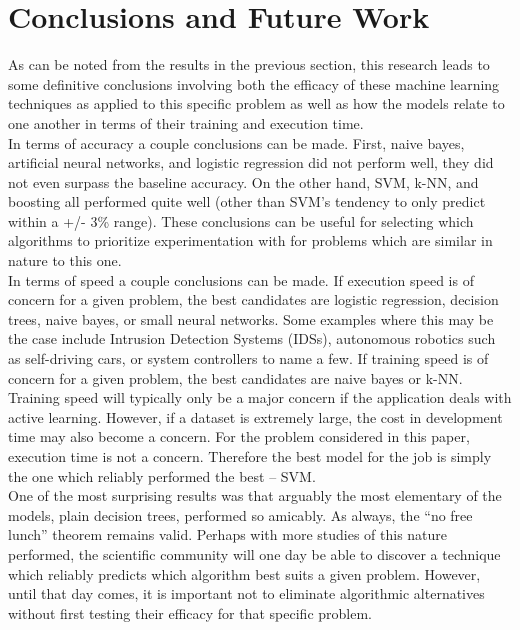 \documentclass[titlepage]{article}
\begin{document}
\section{Conclusions and Future Work}
As can be noted from the results in the previous section, this research leads to some definitive conclusions involving both the efficacy of these machine learning techniques as applied to this specific problem as well as how the models relate to one another in terms of their training and execution time.\\
In terms of accuracy a couple conclusions can be made. First, naive bayes, artificial neural networks, and logistic regression did not perform well, they did not even surpass the baseline accuracy. On the other hand, SVM, k-NN, and boosting all performed quite well (other than SVM's tendency to only predict within a +/- 3\% range). These conclusions can be useful for selecting which algorithms to prioritize experimentation with for problems which are similar in nature to this one.\\
In terms of speed a couple conclusions can be made. If execution speed is of concern for a given problem, the best candidates are logistic regression, decision trees, naive bayes, or small neural networks. Some examples where this may be the case include Intrusion Detection Systems (IDSs), autonomous robotics such as self-driving cars, or system controllers to name a few. If training speed is of concern for a given problem, the best candidates are naive bayes or k-NN. Training speed will typically only be a major concern if the application deals with active learning. However, if a dataset is extremely large, the cost in development time may also become a concern. For the problem considered in this paper, execution time is not a concern. Therefore the best model for the job is simply the one which reliably performed the best -- SVM.\\
One of the most surprising results was that arguably the most elementary of the models, plain decision trees, performed so amicably. As always, the ``no free lunch'' theorem remains valid. Perhaps with more studies of this nature performed, the scientific community will one day be able to discover a technique which reliably predicts which algorithm best suits a given problem. However, until that day comes, it is important not to eliminate algorithmic alternatives without first testing their efficacy for that specific problem.



\newpage
\printbibliography
\newpage
\end{document}
